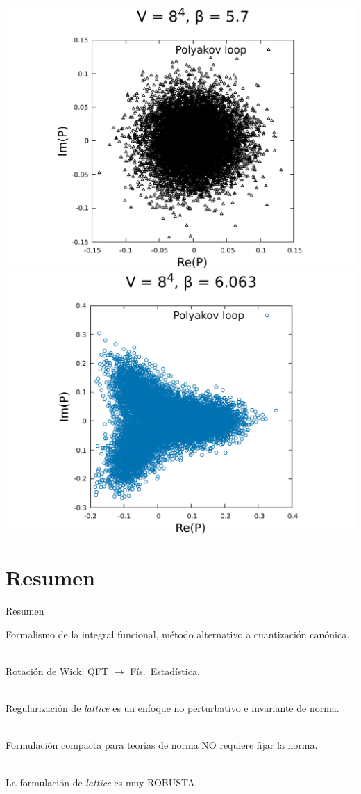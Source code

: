 \documentclass[11pt]{beamer}
\begin{document}
\begin{frame}
\begin{center}
\includegraphics[scale=0.25]{figures/polyakov_loop_beta=5_7.pdf}
\includegraphics[scale=0.25]{figures/polyakov_loop.pdf}
\end{center}
\end{frame}

\section{Resumen}
\begin{frame}{Resumen}

Formalismo de la integral funcional, método alternativo a cuantización canónica. \\~

Rotación de Wick: QFT $\to$ Fís.\ Estadística.  \\~

Regularización de \emph{lattice} es un enfoque no perturbativo e invariante de norma. \\~

Formulación compacta para teorías de norma NO requiere fijar la norma. \\~

La formulación de \emph{lattice} es muy ROBUSTA.
    
\end{frame}
\end{document}
